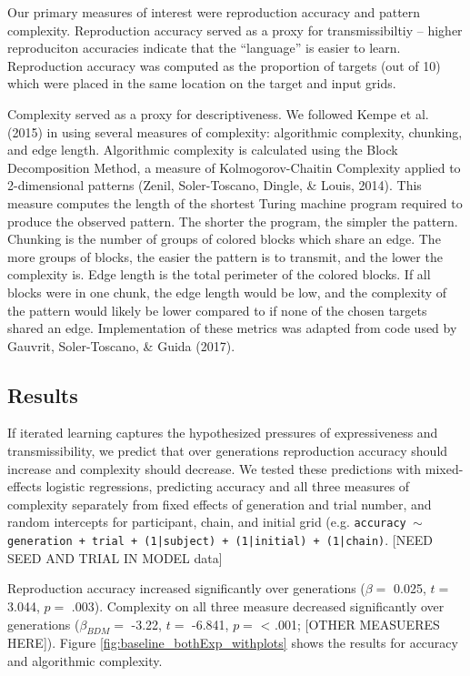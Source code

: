 \documentclass[10pt, letterpaper]{article}
\begin{document}
Our primary measures of interest were reproduction accuracy and pattern
complexity. Reproduction accuracy served as a proxy for transmissibiltiy
-- higher reproduciton accuracies indicate that the ``language'' is
easier to learn. Reproduction accuracy was computed as the proportion of
targets (out of 10) which were placed in the same location on the target
and input grids.

Complexity served as a proxy for descriptiveness. We followed Kempe et
al. (2015) in using several measures of complexity: algorithmic
complexity, chunking, and edge length. Algorithmic complexity is
calculated using the Block Decomposition Method, a measure of
Kolmogorov-Chaitin Complexity applied to 2-dimensional patterns (Zenil,
Soler-Toscano, Dingle, \& Louis, 2014). This measure computes the length
of the shortest Turing machine program required to produce the observed
pattern. The shorter the program, the simpler the pattern. Chunking is
the number of groups of colored blocks which share an edge. The more
groups of blocks, the easier the pattern is to transmit, and the lower
the complexity is. Edge length is the total perimeter of the colored
blocks. If all blocks were in one chunk, the edge length would be low,
and the complexity of the pattern would likely be lower compared to if
none of the chosen targets shared an edge. Implementation of these
metrics was adapted from code used by Gauvrit, Soler-Toscano, \& Guida
(2017).

\hypertarget{results}{%
\subsection{Results}\label{results}}

If iterated learning captures the hypothesized pressures of
expressiveness and transmissibility, we predict that over generations
reproduction accuracy should increase and complexity should decrease. We
tested these predictions with mixed-effects logistic regressions,
predicting accuracy and all three measures of complexity separately from
fixed effects of generation and trial number, and random intercepts for
participant, chain, and initial grid (e.g.
\texttt{accuracy $\sim$ generation + trial + (1|subject) + (1|initial) + (1|chain)}.
{[}NEED SEED AND TRIAL IN MODEL data{]}

Reproduction accuracy increased significantly over generations
(\(\beta =\) 0.025, \(t =\) 3.044, \(p =\) .003). Complexity on all
three measure decreased significantly over generations
(\(\beta_{BDM} =\) -3.22, \(t =\) -6.841, \(p =\) \textless{} .001;
{[}OTHER MEASUERES HERE{]}). Figure \ref{fig:baseline_bothExp_withplots}
shows the results for accuracy and algorithmic complexity.
\end{document}
